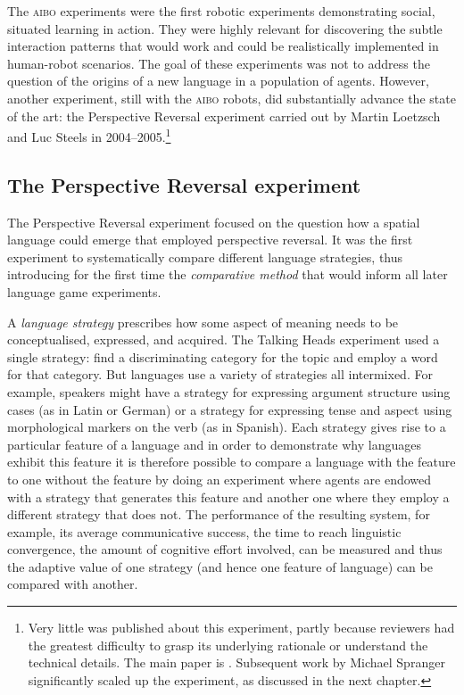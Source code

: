 The \textsc{aibo} experiments were the first robotic experiments demonstrating social, situated learning in action. 
They were highly relevant for discovering the subtle interaction patterns that would work and 
could be realistically implemented in human-robot scenarios. The goal of these experiments was 
not to address the question of the origins of a 
new language in a population of agents. However, another experiment, still with the \textsc{aibo} robots,  
did substantially advance the state of the art: the Perspective Reversal experiment carried out by Martin Loetzsch 
and Luc Steels in 2004--2005.\footnote{
Very little was published about this experiment, partly because reviewers had the greatest difficulty to grasp 
its underlying rationale or understand the technical details. The main paper is \cite{Steels:2008spatial}. 
Subsequent work by Michael Spranger significantly scaled up the experiment, as discussed in the next chapter.}

\subsection{The Perspective Reversal experiment}

The Perspective Reversal experiment  focused on the question how a spatial language could emerge that employed
perspective reversal. It was the first experiment to systematically compare different language strategies, thus 
introducing for the first time the {\itshape comparative method}  
that would inform all later language game experiments. 

A {\itshape language strategy}  
prescribes how some aspect of meaning needs to be conceptualised, expressed, and acquired. 
The Talking Heads experiment used a single strategy: find a discriminating category for the topic and employ a word 
for that category. But languages use a variety of strategies all intermixed. 
For example, speakers might have a strategy for expressing argument structure using cases (as in Latin or German) or 
a strategy for expressing tense and aspect using morphological markers on the verb (as in Spanish). Each strategy gives 
rise to a particular feature of a language and in order to demonstrate why languages exhibit this feature it is therefore
possible to compare a language with the feature to one without the feature by doing an experiment where
agents are endowed with a strategy that generates this feature and another one where they employ a different strategy
that does not. The performance of the resulting system, for example, its average communicative success, the time to reach 
linguistic convergence, the amount of cognitive effort involved, can be measured and thus the adaptive value of one 
strategy (and hence one feature of language) can be compared with another. 

